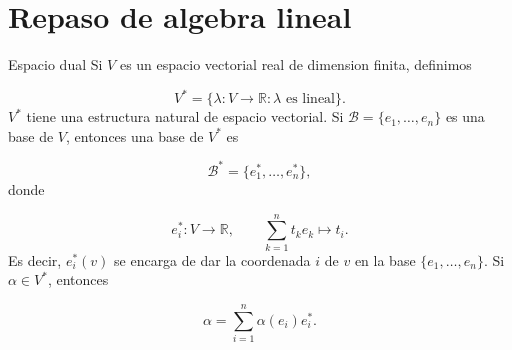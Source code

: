 \section{Repaso de algebra lineal}
\begin{bookdefinition}{Espacio dual}
Si $V$ es un espacio vectorial real de dimension finita, definimos

\[
V^*=\{\lambda:V \to \mathbb R : \lambda \text{ es lineal}\}.
\]
$V^*$ tiene una estructura natural de espacio vectorial. Si $\mathcal B=\{e_1,\ldots,e_n\}$ es una base de $V$, entonces una base de $V^*$ es

\[
\mathcal B^*=\{e_1^*,\ldots,e_n^*\},
\]
donde

\[
e_i^*:V \to \mathbb R,\qquad \sum_{k=1}^n t_k e_k \mapsto t_i.
\]
Es decir, $e_i^*(v)$ se encarga de dar la coordenada $i$ de $v$ en la base $\{e_1,\ldots,e_n\}$. Si $\alpha \in V^*$, entonces

\[
\alpha = \sum_{i=1}^n \alpha(e_i)e_i^*.
\]
\end{bookdefinition}
